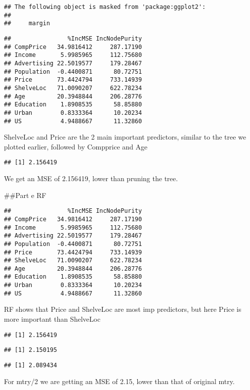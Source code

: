 \documentclass[
]{article}
\begin{document}
\begin{verbatim}
## The following object is masked from 'package:ggplot2':
## 
##     margin
\end{verbatim}

\begin{verbatim}
##                %IncMSE IncNodePurity
## CompPrice   34.9816412     287.17190
## Income       5.9985965     112.75680
## Advertising 22.5019577     179.28467
## Population  -0.4400871      80.72751
## Price       73.4424794     733.14939
## ShelveLoc   71.0090207     622.78234
## Age         20.3948844     206.28776
## Education    1.8908535      58.85880
## Urban        0.8333364      10.20234
## US           4.9488667      11.32860
\end{verbatim}

ShelveLoc and Price are the 2 main important predictors, similar to the
tree we plotted earlier, followed by Compprice and Age

\begin{verbatim}
## [1] 2.156419
\end{verbatim}

We get an MSE of 2.156419, lower than pruning the tree.

\#\#Part e RF

\begin{verbatim}
##                %IncMSE IncNodePurity
## CompPrice   34.9816412     287.17190
## Income       5.9985965     112.75680
## Advertising 22.5019577     179.28467
## Population  -0.4400871      80.72751
## Price       73.4424794     733.14939
## ShelveLoc   71.0090207     622.78234
## Age         20.3948844     206.28776
## Education    1.8908535      58.85880
## Urban        0.8333364      10.20234
## US           4.9488667      11.32860
\end{verbatim}

RF shows that Price and ShelveLoc are most imp predictors, but here
Price is more important than ShelveLoc

\begin{verbatim}
## [1] 2.156419
\end{verbatim}

\begin{verbatim}
## [1] 2.150195
\end{verbatim}

\begin{verbatim}
## [1] 2.089434
\end{verbatim}

For mtry/2 we are getting an MSE of 2.15, lower than that of original
mtry.
\end{document}
